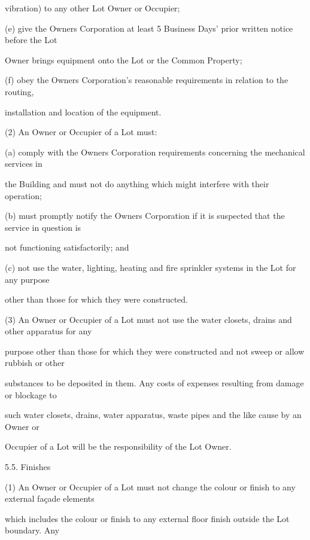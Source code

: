 \documentclass{article}
\begin{document}
{\fontsize{10.02}{1}vibration) to any other Lot Owner or Occupier; }

{\fontsize{9.962}{1}(e) give the Owners Corporation at least 5 Business Days’ prior written notice before the Lot }

{\fontsize{10.02}{1}Owner brings equipment onto the Lot or the Common Property; }

{\fontsize{9.962}{1}(f) obey the Owners Corporation’s reasonable requirements in relation to the routing, }

{\fontsize{10.02}{1}installation and location of the equipment. }

{\fontsize{9.962}{1}(2) An Owner or Occupier of a Lot must: }

{\fontsize{9.962}{1}(a) comply with the Owners Corporation requirements concerning the mechanical services in }

{\fontsize{10.02}{1}the Building and must not do anything which might interfere with their operation; }

{\fontsize{9.962}{1}(b) must promptly notify the Owners Corporation if it is suspected that the service in question is }

{\fontsize{10.02}{1}not functioning satisfactorily; and }

{\fontsize{9.962}{1}(c) not use the water, lighting, heating and fire sprinkler systems in the Lot for any purpose }

{\fontsize{10.02}{1}other than those for which they were constructed. }

{\fontsize{9.962}{1}(3) An Owner or Occupier of a Lot must not use the water closets, drains and other apparatus for any }

{\fontsize{10.02}{1}purpose other than those for which they were constructed and not sweep or allow rubbish or other }

{\fontsize{10.02}{1}substances to be deposited in them. Any costs of expenses resulting from damage or blockage to }

{\fontsize{10.02}{1}such water closets, drains, water apparatus, waste pipes and the like cause by an Owner or }

{\fontsize{10.02}{1}Occupier of a Lot will be the responsibility of the Lot Owner. }

{\fontsize{9.99}{1}5.5. Finishes }

{\fontsize{9.962}{1}(1) An Owner or Occupier of a Lot must not change the colour or finish to any external façade elements }

{\fontsize{10.02}{1}which includes the colour or finish to any external floor finish outside the Lot boundary. Any }
\end{document}
